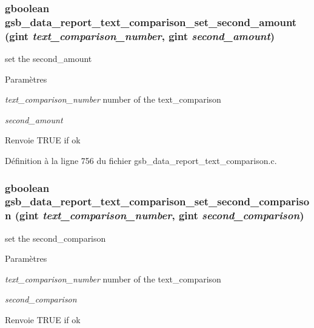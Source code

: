 \subsubsection[{gsb\_\-data\_\-report\_\-text\_\-comparison\_\-set\_\-second\_\-amount}]{\setlength{\rightskip}{0pt plus 5cm}gboolean gsb\_\-data\_\-report\_\-text\_\-comparison\_\-set\_\-second\_\-amount (gint {\em text\_\-comparison\_\-number}, \/  gint {\em second\_\-amount})}\label{gsb__data__report__text__comparison_8h_a76aabed5bda5d92ddd0e4a8fc43ab208}
set the second\_\-amount


\begin{DoxyParams}{Paramètres}
\item[{\em text\_\-comparison\_\-number}]number of the text\_\-comparison \item[{\em second\_\-amount}]\end{DoxyParams}
\begin{DoxyReturn}{Renvoie}
TRUE if ok 
\end{DoxyReturn}


Définition à la ligne 756 du fichier gsb\_\-data\_\-report\_\-text\_\-comparison.c.

\subsubsection[{gsb\_\-data\_\-report\_\-text\_\-comparison\_\-set\_\-second\_\-comparison}]{\setlength{\rightskip}{0pt plus 5cm}gboolean gsb\_\-data\_\-report\_\-text\_\-comparison\_\-set\_\-second\_\-comparison (gint {\em text\_\-comparison\_\-number}, \/  gint {\em second\_\-comparison})}\label{gsb__data__report__text__comparison_8h_a864d1f692a587270130597a4e46160c6}
set the second\_\-comparison


\begin{DoxyParams}{Paramètres}
\item[{\em text\_\-comparison\_\-number}]number of the text\_\-comparison \item[{\em second\_\-comparison}]\end{DoxyParams}
\begin{DoxyReturn}{Renvoie}
TRUE if ok 
\end{DoxyReturn}


